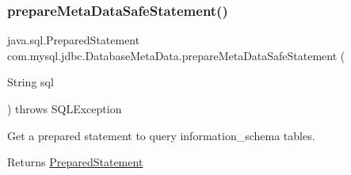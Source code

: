\subsubsection{\texorpdfstring{prepare\+Meta\+Data\+Safe\+Statement()}{prepareMetaDataSafeStatement()}}
{\footnotesize\ttfamily java.\+sql.\+Prepared\+Statement com.\+mysql.\+jdbc.\+Database\+Meta\+Data.\+prepare\+Meta\+Data\+Safe\+Statement (\begin{DoxyParamCaption}\item[{String}]{sql }\end{DoxyParamCaption}) throws S\+Q\+L\+Exception\hspace{0.3cm}{\ttfamily [protected]}}

Get a prepared statement to query information\+\_\+schema tables.

\begin{DoxyReturn}{Returns}
\mbox{\hyperlink{classcom_1_1mysql_1_1jdbc_1_1_prepared_statement}{Prepared\+Statement}} 
\end{DoxyReturn}

